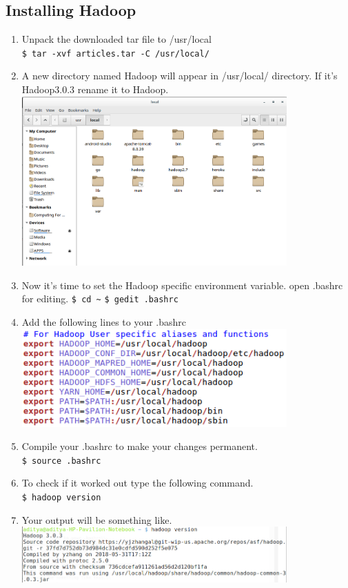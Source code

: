 \documentclass[12pt]{article}%
\begin{document}
\subsection{Installing Hadoop}
\begin{enumerate}
\item Unpack the downloaded tar file to /usr/local\\
\lstinline{$ tar -xvf articles.tar -C /usr/local/}
\item A new directory named Hadoop will appear in /usr/local/ directory. If it's Hadoop3.0.3 rename it to Hadoop.\\
\includegraphics[width=0.8\textwidth]{dir1.png}
\item Now it's time to set the Hadoop specific environment variable. open .bashrc for editing.
\lstinline{$ cd ~}
\lstinline{$ gedit .bashrc}
\item Add the following lines to your .bashrc\\
\includegraphics[width=0.8\textwidth]{hadoopenv.png}
\item  Compile your .bashrc to make your changes permanent.\\
\lstinline{$ source .bashrc}
\item  To check if it worked out type the following command.\\
\lstinline{$ hadoop version}
\item  Your output will be something like.\\
\includegraphics[width=0.8\textwidth]{hadver.png}
\end{enumerate}
\end{document}
